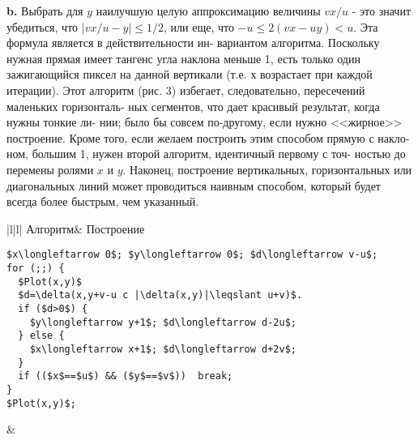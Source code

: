 \textbf{b.} Выбрать для $y$ наилучшую целую аппроксимацию величины $vx/u$\linebreak
- это значит убедиться, что $|vx/u-y|\leqslant 1/2$, или еще, что\linebreak
$-u\leqslant2(vx-uy)<u$. Эта формула является в действительности ин-\linebreak
вариантом алгоритма. Поскольку нужная прямая имеет тангенс угла\linebreak
наклона меньше 1, есть только один зажигающийся пиксел на данной\linebreak
вертикали (т.е. $х$ возрастает при каждой итерации). Этот алгоритм\linebreak
(рис. 3) избегает, следовательно, пересечений маленьких горизонталь-\linebreak
ных сегментов, что дает красивый результат, когда нужны тонкие ли-\linebreak
нии; было бы совсем по-другому, если нужно <<жирное>> построение.\newline
\hspace*{15pt}Кроме того, если желаем построить этим способом прямую с накло-\linebreak
ном, большим 1, нужен второй алгоритм, идентичный первому с точ-\linebreak
ностью до перемены ролями $x$ и $y$. Наконец, построение вертикальных,\linebreak
горизонтальных или диагональных линий может проводиться наивным\linebreak
способом, который будет всегда более быстрым, чем указанный.\newline
\begin{center}
\begin{tabular}{|l|l|}
\hline
\hspace*{50pt}Алгоритм&
\hspace{5pt}Построение\\
{\begin{lstlisting}[mathescape=true, frame=none]
$x\longleftarrow 0$; $y\longleftarrow 0$; $d\longleftarrow v-u$;
for (;;) {
  $Plot(x,y)$
  $d=\delta(x,y+v-u c |\delta(x,y)|\leqslant u+v)$.
  if ($d>0$) {
    $y\longleftarrow y+1$; $d\longleftarrow d-2u$;
  } else {
    $x\longleftarrow x+1$; $d\longleftarrow d+2v$;
  }
  if (($x$==$u$) && ($y$==$v$))  break;
}
$Plot(x,y)$;
\end{lstlisting}}
&
\\
\hline
\end{tabular}
\end{center}
